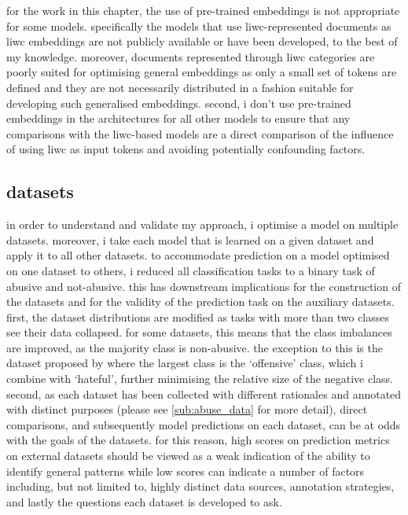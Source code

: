 for the work in this chapter, the use of pre-trained embeddings is not appropriate for some models.
specifically the models that use liwc-represented documents as liwc embeddings are not publicly available or have been developed, to the best of my knowledge.
moreover, documents represented through liwc categories are poorly suited for optimising general embeddings as only a small set of tokens are defined and they are not necessarily distributed in a fashion suitable for developing such generalised  embeddings.
second, i don't use pre-trained embeddings in the architectures for all other models to ensure that any comparisons with the liwc-based models are a direct comparison of the influence of using liwc as input tokens and avoiding potentially confounding factors.

\subsection{datasets}\label{sub:liwc_datasets}
in order to understand and validate my approach, i optimise a model on multiple datasets.
moreover, i take each model that is learned on a given dataset and apply it to all other datasets.
to accommodate prediction on a model optimised on one dataset to others, i reduced all classification tasks to a binary task of abusive and not-abusive.
this has downstream implications for the construction of the datasets and for the validity of the prediction task on the auxiliary datasets.
first, the dataset distributions are modified as tasks with more than two classes see their data collapsed. 
for some datasets, this means that the class imbalances are improved, as the majority class is non-abusive.
the exception to this is the dataset proposed by \citet{davidson:2017} where the largest class is the `offensive' class, which i combine with `hateful', further minimising the relative size of the negative class.
second, as each dataset has been collected with different rationales and annotated with distinct purposes (please see \cref{sub:abuse_data} for more detail), direct comparisons, and subsequently model predictions on each dataset, can be at odds with the goals of the datasets.
for this reason, high scores on prediction metrics on external datasets should be viewed as a weak indication of the ability to identify general patterns while low scores can indicate a number of factors including, but not limited to, highly distinct data sources, annotation strategies, and lastly the questions each dataset is developed to ask.

